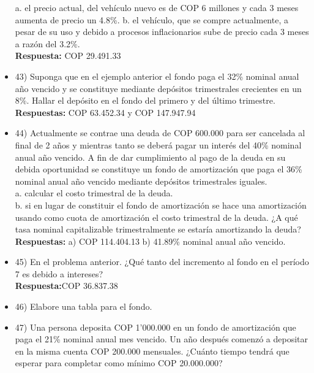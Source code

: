 \begin{itemize}
       a.	el precio actual, del vehículo nuevo es de COP 6 millones y cada 3 meses aumenta de precio un 4.8\%.
       b.	el vehículo, que se compre actualmente, a pesar de su uso y debido a procesos inflacionarios sube de precio cada 3 meses a razón del 3.2\%.\\
       \textbf{Respuesta:} COP 29.491.33
       \medskip

 \item 43) Suponga que en el ejemplo anterior el fondo paga el 32\% nominal anual año vencido y se constituye mediante depósitos trimestrales crecientes en un 8\%. Hallar el depósito en el fondo del primero y del último trimestre.\\
       \textbf{Respuestas:} COP 63.452.34 y COP 147.947.94
       \medskip

 \item 44)  Actualmente se contrae una deuda de COP 600.000 para ser cancelada al final de 2 años y mientras tanto se deberá pagar un interés del 40\% nominal anual año vencido. A fin de dar cumplimiento al pago de la deuda en su debida oportunidad se constituye un fondo de amortización que paga el 36\% nominal anual año vencido mediante depósitos trimestrales iguales. \\

       a.	calcular el costo trimestral de la deuda.\\
       b.	si en lugar de constituir el fondo de amortización se hace una amortización usando como cuota de amortización el costo trimestral de la deuda. ¿A qué tasa nominal capitalizable trimestralmente se estaría amortizando la deuda?\\
       \textbf{Respuestas:} a) COP 114.404.13 b) 41.89\%  nominal anual año vencido.
       \medskip

 \item 45) En el problema anterior. ¿Qué tanto del incremento al fondo en el período 7 es debido a intereses? \\
       \textbf{Respuesta:}COP 36.837.38
       \medskip

 \item 46) Elabore una tabla para el fondo.
       \medskip

 \item 47) Una persona deposita COP 1'000.000 en un fondo de amortización que paga el 21\% nominal anual mes vencido. Un año después comenzó a depositar en la misma cuenta COP 200.000 mensuales. ¿Cuánto tiempo tendrá que esperar para completar como mínimo COP 20.000.000? \\
       \medskip


\end{itemize}
